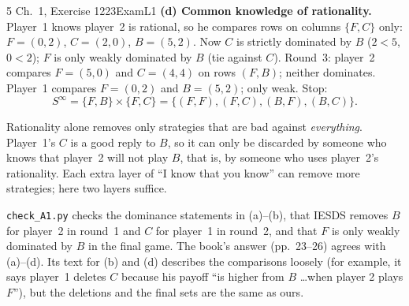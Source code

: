 \begin{exsol}{5}{\MG{} Ch.~1, Exercise 12}{23}{Exam}{L1}
\textbf{(d) Common knowledge of rationality.} Player~1 knows player~2 is rational, so he compares
rows on columns $\{F, C\}$ only: $F = (0, 2)$, $C = (2, 0)$, $B = (5, 2)$. Now $C$ is strictly
dominated by $B$ ($2 < 5$, $0 < 2$); $F$ is only weakly dominated by $B$ (tie against $C$).
Round~3: player~2 compares $F = (5, 0)$ and $C = (4, 4)$ on rows $(F, B)$; neither dominates.
Player~1 compares $F = (0, 2)$ and $B = (5, 2)$; only weak. Stop:
\[
  S^\infty = \{F, B\} \times \{F, C\} = \{(F,F), (F,C), (B,F), (B,C)\}.
\]

\interp Rationality alone removes only strategies that are bad against \emph{everything}.
Player~1's $C$ is a good reply to $B$, so it can only be discarded by someone who knows that
player~2 will not play $B$, that is, by someone who uses player~2's rationality. Each extra layer
of ``I know that you know'' can remove more strategies; here two layers suffice.

\verify \texttt{check\_A1.py} checks the dominance statements in (a)--(b), that IESDS removes $B$
for player~2 in round~1 and $C$ for player~1 in round~2, and that $F$ is only weakly dominated
by $B$ in the final game. The book's answer (pp.~23--26) agrees with (a)--(d). Its text for (b)
and (d) describes the comparisons loosely (for example, it says player~1 deletes $C$ because his
payoff ``is higher from $B$ \dots when player 2 plays $F$''), but the deletions and the final
sets are the same as ours.

\end{exsol}
